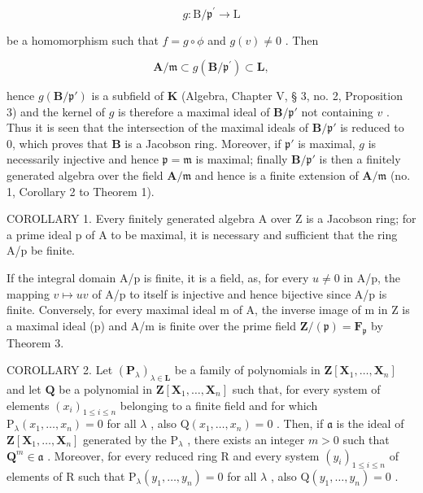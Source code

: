 \[
g \colon \mathrm{B} / \mathfrak {p} ^ {\prime} \rightarrow \mathrm{L}
\]

be a homomorphism such that \(f = g \circ \phi\) and \(g(v) \neq 0\) . Then

\[
\mathbf {A} / \mathfrak {m} \subset g (\mathbf {B} / \mathfrak {p} ^ {\prime}) \subset \mathbf {L},
\]

hence \(g(\mathbf{B} / \mathfrak{p}')\) is a subfield of \(\mathbf{K}\) (Algebra, Chapter V, § 3, no. 2, Proposition 3) and the kernel of \(g\) is therefore a maximal ideal of \(\mathbf{B} / \mathfrak{p}'\) not containing \(v\) . Thus it is seen that the intersection of the maximal ideals of \(\mathbf{B} / \mathfrak{p}'\) is reduced to 0, which proves that \(\mathbf{B}\) is a Jacobson ring. Moreover, if \(\mathfrak{p}'\) is maximal, \(g\) is necessarily injective and hence \(\mathfrak{p} = \mathfrak{m}\) is maximal; finally \(\mathbf{B} / \mathfrak{p}'\) is then a finitely generated algebra over the field \(\mathbf{A} / \mathfrak{m}\) and hence is a finite extension of \(\mathbf{A} / \mathfrak{m}\) (no. 1, Corollary 2 to Theorem 1).

COROLLARY 1. Every finitely generated algebra A over Z is a Jacobson ring; for a prime ideal p of A to be maximal, it is necessary and sufficient that the ring A/p be finite.

If the integral domain A/p is finite, it is a field, as, for every \(u \neq 0\) in A/p, the mapping \(v \mapsto uv\) of A/p to itself is injective and hence bijective since A/p is finite. Conversely, for every maximal ideal m of A, the inverse image of m in Z is a maximal ideal (p) and A/m is finite over the prime field \(\mathbf{Z}/(\mathfrak{p}) = \mathbf{F}_{\mathfrak{p}}\) by Theorem 3.

COROLLARY 2. Let \((\mathbf{P}_{\lambda})_{\lambda \in \mathbf{L}}\) be a family of polynomials in \(\mathbf{Z}[\mathbf{X}_1,\ldots ,\mathbf{X}_n]\) and let \(\mathbf{Q}\) be a polynomial in \(\mathbf{Z}[\mathbf{X}_1,\dots ,\mathbf{X}_n]\) such that, for every system of elements \((x_i)_{1\leqslant i\leqslant n}\) belonging to a finite field and for which \(\mathrm{P}_{\lambda}(x_1,\ldots ,x_n) = 0\) for all \(\lambda\) , also \(\mathrm{Q}(x_1,\ldots ,x_n) = 0\) . Then, if \(\mathfrak{a}\) is the ideal of \(\mathbf{Z}[\mathbf{X}_1,\ldots ,\mathbf{X}_n]\) generated by the \(\mathrm{P}_{\lambda}\) , there exists an integer \(m > 0\) such that \(\mathbf{Q}^m\in \mathfrak{a}\) . Moreover, for every reduced ring R and every system \((y_i)_{1\leqslant i\leqslant n}\) of elements of R such that \(\mathrm{P}_{\lambda}(y_1,\ldots ,y_n) = 0\) for all \(\lambda\) , also \(\mathrm{Q}(y_1,\ldots ,y_n) = 0\) .

